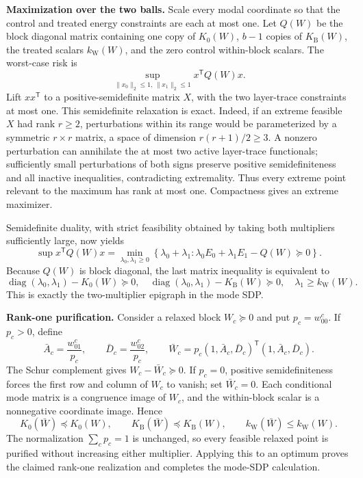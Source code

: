 \textbf{Maximization over the two balls.}  Scale every modal coordinate so that the control and treated energy constraints are each at most one.  Let \(Q(W)\) be the block diagonal matrix containing one copy of \(K_0(W)\), \(b-1\) copies of \(K_{\mathrm B}(W)\), the treated scalars \(k_{\mathrm W}(W)\), and the zero control within-block scalars.  The worst-case risk is
\[
\sup_{\|x_0\|_2\le1,\,\|x_1\|_2\le1}x^{\mathsf T}Q(W)x.
\]
Lift \(xx^{\mathsf T}\) to a positive-semidefinite matrix \(X\), with the two layer-trace constraints at most one.  This semidefinite relaxation is exact.  Indeed, if an extreme feasible \(X\) had rank \(r\ge2\), perturbations within its range would be parameterized by a symmetric \(r\times r\) matrix, a space of dimension \(r(r+1)/2\ge3\).  A nonzero perturbation can annihilate the at most two active layer-trace functionals; sufficiently small perturbations of both signs preserve positive semidefiniteness and all inactive inequalities, contradicting extremality.  Thus every extreme point relevant to the maximum has rank at most one.  Compactness gives an extreme maximizer.

Semidefinite duality, with strict feasibility obtained by taking both multipliers sufficiently large, now yields
\[
\sup x^{\mathsf T}Q(W)x
=\min_{\lambda_0,\lambda_1\ge0}
\left\{\lambda_0+\lambda_1:
\lambda_0E_0+\lambda_1E_1-Q(W)\succeq0\right\}.
\]
Because \(Q(W)\) is block diagonal, the last matrix inequality is equivalent to
\[
\operatorname{diag}(\lambda_0,\lambda_1)-K_0(W)\succeq0,
\quad
\operatorname{diag}(\lambda_0,\lambda_1)-K_{\mathrm B}(W)\succeq0,
\quad
\lambda_1\ge k_{\mathrm W}(W).
\]
This is exactly the two-multiplier epigraph in the mode SDP.

\textbf{Rank-one purification.}  Consider a relaxed block \(W_c\succeq0\) and put \(p_c=w^c_{00}\).  If \(p_c>0\), define
\[
\bar A_c=\frac{w^c_{01}}{p_c},
\qquad
\bar D_c=\frac{w^c_{02}}{p_c},
\qquad
\bar W_c=p_c(1,\bar A_c,\bar D_c)^{\mathsf T}(1,\bar A_c,\bar D_c).
\]
The Schur complement gives \(W_c-\bar W_c\succeq0\).  If \(p_c=0\), positive semidefiniteness forces the first row and column of \(W_c\) to vanish; set \(\bar W_c=0\).  Each conditional mode matrix is a congruence image of \(W_c\), and the within-block scalar is a nonnegative coordinate image.  Hence
\[
K_0(\bar W)\preceq K_0(W),
\qquad
K_{\mathrm B}(\bar W)\preceq K_{\mathrm B}(W),
\qquad
k_{\mathrm W}(\bar W)\le k_{\mathrm W}(W).
\]
The normalization \(\sum_cp_c=1\) is unchanged, so every feasible relaxed point is purified without increasing either multiplier.  Applying this to an optimum proves the claimed rank-one realization and completes the mode-SDP calculation.
